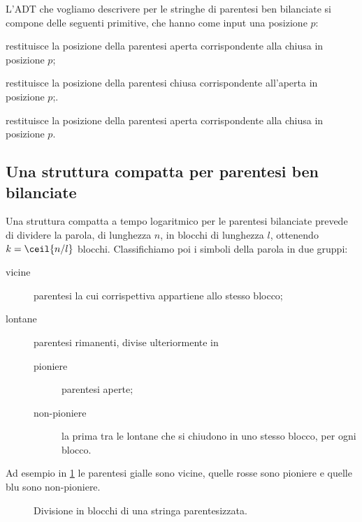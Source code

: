 L'ADT che vogliamo descrivere per le stringhe di parentesi ben bilanciate si compone delle seguenti primitive, che hanno come input una posizione $p$:
\begin{description}
	\renewcommand{\dyfindopen}{\mathbf{find\_open}}
	\renewcommand{\dyfindclose}{\mathbf{find\_close}}
	\renewcommand{\dyenclose}{\mathbf{enclose}}
	\item[$\dyfindopen$] restituisce la posizione della parentesi aperta corrispondente alla chiusa in posizione $p$;
	\item[$\dyfindclose$] restituisce la posizione della parentesi chiusa corrispondente all'aperta in posizione $p$;.
	\item[$\dyenclose$] restituisce la posizione della parentesi aperta corrispondente alla chiusa in posizione $p$.
\end{description}


\subsection{Una struttura compatta per parentesi ben bilanciate}
Una struttura compatta a tempo logaritmico per le parentesi bilanciate prevede di dividere la parola, di lunghezza $n$, in blocchi di lunghezza $l$, ottenendo $k=\ceil{n/l}$ blocchi.
Classifichiamo poi i simboli della parola in due gruppi:
\begin{description}
	\item[vicine] parentesi la cui corrispettiva appartiene allo stesso blocco;
	\item[lontane] parentesi rimanenti, divise ulteriormente in
		\begin{description}
			\item[pioniere] parentesi aperte;
			\item[non-pioniere] la prima tra le lontane che si chiudono in uno stesso blocco, per ogni blocco.
		\end{description}
\end{description}
Ad esempio in \cref{fig:paren_blocks} le parentesi gialle sono vicine, quelle rosse sono pioniere e quelle blu sono non-pioniere.

\begin{figure}[ht]
	\centering
	
	\caption{Divisione in blocchi di una stringa parentesizzata.}
	\label{fig:paren_blocks}
\end{figure}

